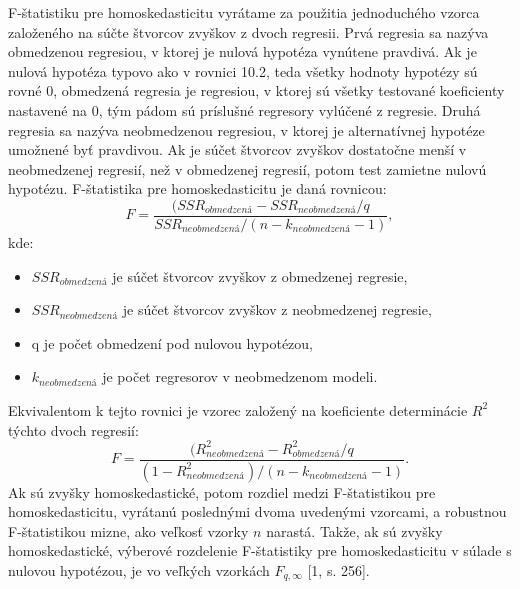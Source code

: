 \documentclass[]{tukediphc}
\begin{document}
F-štatistiku pre homoskedasticitu vyrátame za použitia jednoduchého vzorca založeného na súčte štvorcov zvyškov z dvoch regresii. Prvá regresia sa nazýva obmedzenou regresiou, v ktorej je nulová hypotéza vynútene pravdivá. Ak je nulová hypotéza typovo ako v rovnici 10.2, teda všetky hodnoty hypotézy sú rovné 0, obmedzená regresia je regresiou, v ktorej sú všetky testované koeficienty nastavené na 0, tým pádom sú príslušné regresory vylúčené z regresie. Druhá regresia sa nazýva neobmedzenou regresiou, v ktorej je alternatívnej hypotéze umožnené byť pravdivou. Ak je súčet štvorcov zvyškov dostatočne menší v neobmedzenej regresií, než v obmedzenej regresií, potom test zamietne nulovú hypotézu. 
F-štatistika pre homoskedasticitu je daná rovnicou:
\begin{equation}
    F= \frac{(SSR_{obmedzená}-SSR_{neobmedzená} / q}{SSR_{neobmedzená}/ (n-k_{neobmedzená}-1)},
\end{equation}
kde:
\begin{itemize}
    \item $SSR_{obmedzená}$ je súčet štvorcov zvyškov z obmedzenej regresie, \item$SSR_{neobmedzená}$ je súčet štvorcov zvyškov z neobmedzenej regresie, 
    \item q je počet obmedzení pod nulovou hypotézou,
    \item $k_{neobmedzená}$ je počet regresorov v neobmedzenom modeli.
\end{itemize}
Ekvivalentom k tejto rovnici je vzorec založený na koeficiente determinácie $R^2$ týchto dvoch regresií:
\begin{equation}
    F= \frac{(R^2_{neobmedzená}-R^2_{obmedzená} / q}{(1 - R^2_{neobmedzená})/ (n-k_{neobmedzená}-1)}.
\end{equation}
Ak sú zvyšky homoskedastické, potom rozdiel medzi F-štatistikou pre homoskedasticitu, vyrátanú poslednými dvoma uvedenými vzorcami, a robustnou F-štatistikou mizne, ako veľkosť vzorky $n$ narastá. Takže, ak sú zvyšky homoskedastické, výberové rozdelenie F-štatistiky pre homoskedasticitu v súlade s nulovou hypotézou, je vo veľkých vzorkách $F_{q,\infty}$ [1, s. 256]. 
\end{document}

